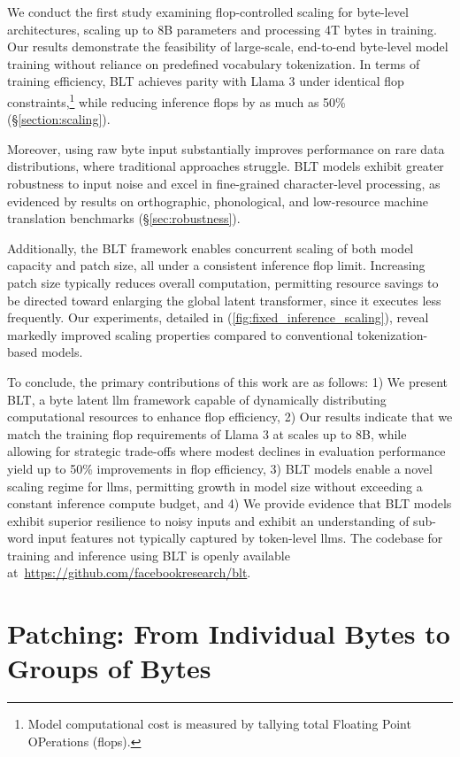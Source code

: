 We conduct the first study examining flop-controlled scaling for byte-level architectures, scaling up to 8B parameters and processing 4T bytes in training. Our results demonstrate the feasibility of large-scale, end-to-end byte-level model training without reliance on predefined vocabulary tokenization. In terms of training efficiency, {\textsc BLT} achieves parity with Llama 3 under identical flop constraints,\footnote{Model computational cost is measured by tallying total Floating Point OPerations (flops).} while reducing inference flops by as much as 50\% (\S\ref{section:scaling}).

Moreover, using raw byte input substantially improves performance on rare data distributions, where traditional approaches struggle. {\textsc BLT} models exhibit greater robustness to input noise and excel in fine-grained character-level processing, as evidenced by results on orthographic, phonological, and low-resource machine translation benchmarks (\S\ref{sec:robustness}).

Additionally, the {\textsc BLT} framework enables concurrent scaling of both model capacity and patch size, all under a consistent inference flop limit. Increasing patch size typically reduces overall computation, permitting resource savings to be directed toward enlarging the global latent transformer, since it executes less frequently. Our experiments, detailed in (\autoref{fig:fixed_inference_scaling}), reveal markedly improved scaling properties compared to conventional tokenization-based models.

To conclude, the primary contributions of this work are as follows: 1) We present {\textsc BLT}, a byte latent llm framework capable of dynamically distributing computational resources to enhance flop efficiency, 2) Our results indicate that we match the training flop requirements of Llama 3 at scales up to 8B, while allowing for strategic trade-offs where modest declines in evaluation performance yield up to 50\% improvements in flop efficiency, 3) {\textsc BLT} models enable a novel scaling regime for llms, permitting growth in model size without exceeding a constant inference compute budget, and 4) We provide evidence that {\textsc BLT} models exhibit superior resilience to noisy inputs and exhibit an understanding of sub-word input features not typically captured by token-level llms. The codebase for training and inference using {\textsc BLT} is openly available at~\url{https://github.com/facebookresearch/blt}.

\section{Patching: From Individual Bytes to Groups of Bytes}
\label{section:patching}

